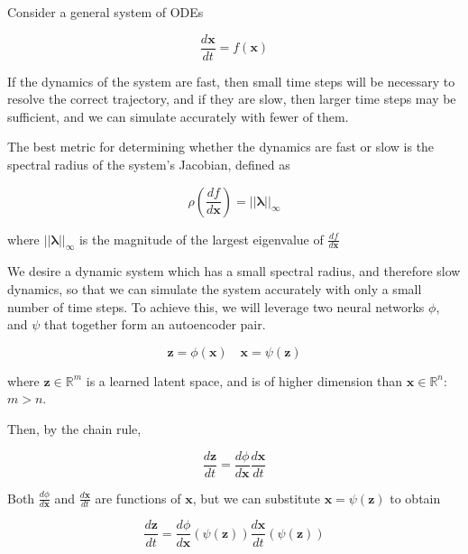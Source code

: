 \documentclass[12pt, letterpaper]{article}
\begin{document}
Consider a general system of ODEs

\begin{equation}
    \frac{d\mathbf{x}}{dt} = f(\mathbf{x})
\end{equation}

If the dynamics of the system are fast, then small time steps will be necessary to resolve the correct trajectory, and if they are slow, then larger time steps may be sufficient, and we can simulate accurately with fewer of them.

The best metric for determining whether the dynamics are fast or slow is the spectral radius of the system's Jacobian, defined as

\begin{equation}
    \rho\left(\frac{df}{d \mathbf{x}}\right) = ||\boldsymbol{\lambda}||_{\infty}
\end{equation}

where $||\boldsymbol{\lambda}||_{\infty}$ is the magnitude of the largest eigenvalue of $\frac{df}{d\mathbf{x}}$

We desire a dynamic system which has a small spectral radius, and therefore slow dynamics, so that we can simulate the system accurately with only a small number of time steps.  To achieve this, we will leverage two neural networks $\phi$, and $\psi$ that together form an autoencoder pair.

\begin{equation}
    \mathbf{z} = \phi(\mathbf{x}) \quad \mathbf{x} = \psi(\mathbf{z})
\end{equation}

where $\mathbf{z} \in \mathbb{R}^m$ is a learned latent space, and is of higher dimension than $\mathbf{x} \in \mathbb{R}^n$:  $m > n$. 

Then, by the chain rule,

\begin{equation}
    \frac{d\mathbf{z}}{dt} = \frac{d \phi}{d \mathbf{x}} \frac{d \mathbf{x}}{dt} 
\end{equation}

Both $\frac{d \phi}{d \mathbf{x}}$ and $\frac{d \mathbf{x}}{dt}$ are functions of $\mathbf{x}$, but we can substitute $\mathbf{x} = \psi(\mathbf{z})$ to obtain

\begin{equation}
    \frac{d\mathbf{z}}{dt} = \frac{d \phi}{d \mathbf{x}} \left( \psi(\mathbf{z}) \right) \frac{d \mathbf{x}}{dt}\left( \psi(\mathbf{z}) \right) 
\end{equation}
\end{document}
